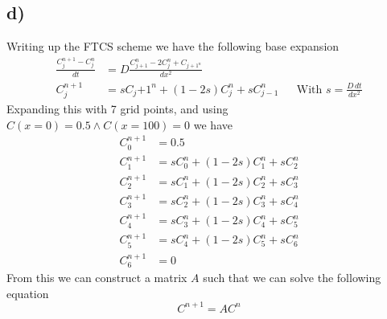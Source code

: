 \documentclass[10pt, a4paper]{amsart}
\begin{document}
\subsection{d)}
Writing up the FTCS scheme we have the following base expansion 
\begin{align}
	\frac{C^{n+1}_j - C_j^n}{dt} &= D \frac{C_{j+1}^n-2C_j^n+C_{j+1^n}}{dx^2}\\
	C_j^{n+1} &= sC_j{+1}^n + (1-2s)C_j^n + sC_{j-1}^n && \text{With $s = \frac{D \, dt}{dx^2}$}
\end{align}
Expanding this with 7 grid points, and using $C(x=0) = 0.5 \land C(x=100) = 0$ we have 
\begin{align}
	C_0^{n+1} &= 0.5 \\
	C_1^{n+1} &= sC_0^n + (1-2s)C_1^n + sC_2^n\\
	C_2^{n+1} &= sC_1^n + (1-2s)C_2^n + sC_3^n\\
	C_3^{n+1} &= sC_2^n + (1-2s)C_3^n + sC_4^n\\
	C_4^{n+1} &= sC_3^n + (1-2s)C_4^n + sC_5^n\\
	C_5^{n+1} &= sC_4^n + (1-2s)C_5^n + sC_6^n\\
	C_6^{n+1} &= 0
\end{align}
From this we can construct a matrix $A$ such that we can solve the following equation 
\begin{equation}
	C^{n+1} = A C^n
\end{equation}
\end{document}
